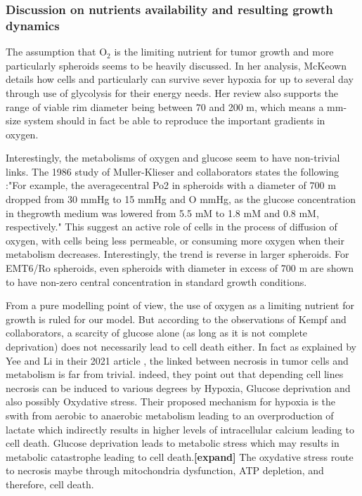 \documentclass[11pt,a4paper]{article}
\begin{document}


\subsubsection{Discussion on nutrients availability and resulting growth dynamics}
The assumption that O$_2$ is the limiting nutrient for tumor growth and more particularly spheroids seems to be heavily discussed. In her analysis, McKeown details how cells and particularly can survive sever hypoxia for up to several day through use of glycolysis for their energy needs. \cite{McKeown2014} Her review also supports the range of viable rim diameter being between 70 and 200 \textmu m, which means a mm-size system should in fact be able to reproduce the important gradients in oxygen.

Interestingly, the metabolisms of oxygen and glucose seem to have non-trivial links. The 1986 study of Muller-Klieser and collaborators states the following :"For example, the averagecentral Po2 in spheroids with a diameter of 700 \textmu m dropped from 30 mmHg to 15 mmHg and O mmHg, as the glucose concentration in thegrowth medium was lowered from 5.5 mM to 1.8 mM and 0.8 mM, respectively."\cite{MuellerKlieser1986} This suggest an active role of cells in the process of diffusion of oxygen, with cells being less permeable, or consuming more oxygen when their metabolism decreases. Interestingly, the trend is reverse in larger spheroids. For EMT6/Ro spheroids, even spheroids with diameter in excess of 700 \textmu m are shown to have non-zero central concentration in standard growth conditions. 

From a pure modelling point of view, the use of oxygen as a limiting nutrient for growth is ruled for our model. But according to the observations of Kempf and collaborators, a scarcity of glucose alone (as long as it is not complete deprivation) does not necessarily lead to cell death either. In fact as explained by  Yee and Li in their 2021 article \cite{Yee2021}, the linked between necrosis in tumor cells and metabolism is far from trivial. indeed,  they point out that depending cell lines necrosis can be induced to various degrees by Hypoxia, Glucose deprivation and also possibly Oxydative stress. Their proposed mechanism for hypoxia is the swith from aerobic to anaerobic metabolism leading to an overproduction of lactate which indirectly results in higher levels of intracellular calcium leading to cell death. Glucose deprivation leads to metabolic stress which may results in metabolic catastrophe leading to cell death.\textbf{[expand]} The oxydative stress route to necrosis maybe through mitochondria dysfunction, ATP depletion, and therefore, cell death.
\end{document}
